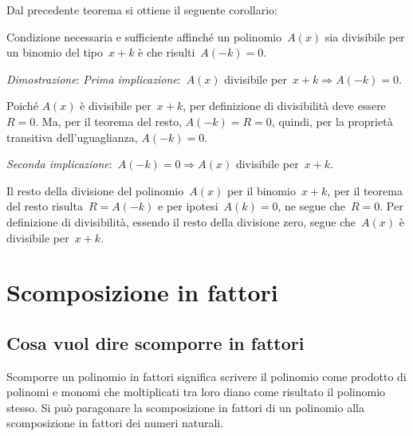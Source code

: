 Dal precedente teorema si ottiene il seguente corollario:

\begin{teorema}[di Ruffini]
Condizione necessaria e sufficiente affinché un polinomio~\(A(x)\) 
sia divisibile per un binomio del tipo~\(x+k\) è
che risulti~\(A(-k)=0\).
\end{teorema}

\emph{Dimostrazione}:
\emph{Prima implicazione}:~\(A(x)\) divisibile 
per~\(x+k\Rightarrow A(-k)=0\).

Poiché \(A(x)\) è divisibile per~\(x+k\), per definizione di divisibilità 
deve essere~\(R=0\). 
Ma, per il teorema del resto, \(A(-k)=R=0\), 
quindi, per la proprietà transitiva dell'uguaglianza, \(A(-k)=0\).

\emph{Seconda implicazione}:~\(A(-k)=0\Rightarrow A(x)\) divisibile per~\(x+k\).

Il resto della divisione del polinomio~\(A(x)\) per il binomio~\(x+k\),
per il teorema del resto risulta~\(R=A(-k)\) e per ipotesi~\(A(k)=0\),
ne segue che~\(R=0\). Per definizione di divisibilità, essendo il
resto della divisione zero, segue che~\(A(x)\) è divisibile per~\(x+k\).


\section{Scomposizione in fattori}

\subsection{Cosa vuol dire scomporre in fattori}
\label{subsec:divpol_scomporre}

Scomporre un polinomio in fattori significa scrivere il polinomio come 
prodotto di polinomi e monomi che
moltiplicati tra loro diano come risultato il polinomio stesso. 
Si può paragonare la scomposizione in fattori
di un polinomio alla scomposizione in fattori dei numeri naturali.

\begin{minipage}{.4\textwidth}
\begin{inaccessibleblock}
 \begin{center}
% 
\scompfattnum
 \end{center}
\end{inaccessibleblock}
\end{minipage}
\begin{minipage}{.6\textwidth}
\begin{inaccessibleblock}
 \begin{center}
% 
\scompfattpol
 \end{center}
\end{inaccessibleblock}
\end{minipage}

